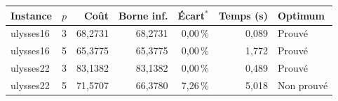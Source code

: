 \begin{tabular}{lrrrrrl}
\toprule
Instance & $p$ & Coût & Borne inf. & Écart$^*$ & Temps (s) & Optimum \\
\midrule
ulysses16 & 3 & 68{,}2731 & 68{,}2731 & 0{,}00\,\% & 0{,}089 & Prouvé \\
ulysses16 & 5 & 65{,}3775 & 65{,}3775 & 0{,}00\,\% & 1{,}772 & Prouvé \\
ulysses22 & 3 & 83{,}1382 & 83{,}1382 & 0{,}00\,\% & 0{,}489 & Prouvé \\
ulysses22 & 5 & 71{,}5707 & 66{,}3780 & 7{,}26\,\% & 5{,}018 & Non prouvé \\
\bottomrule
\end{tabular}
